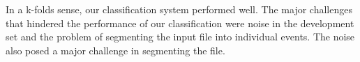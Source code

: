 In a k-folds sense, our classification system performed well. The major challenges that
hindered the performance of our classification were noise in the development set and the
problem of segmenting the input file into individual events. The noise also posed a major
challenge in segmenting the file.

